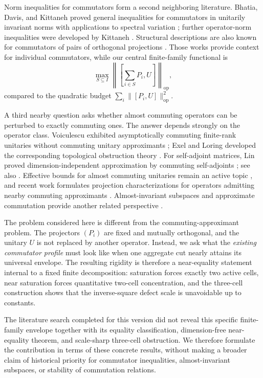 \documentclass[11pt]{article}
\newcommand{\op}{\mathrm{op}}
\begin{document}
Norm inequalities for commutators form a second neighboring literature.
Bhatia, Davis, and Kittaneh proved general inequalities for commutators in
unitarily invariant norms with applications to spectral variation
\cite{BhatiaDavisKittaneh1991}; further operator-norm inequalities were
developed by Kittaneh \cite{Kittaneh2007}.  Structural descriptions are also
known for commutators of pairs of orthogonal projections
\cite{Li2004}.  Those works provide context for individual commutators, while
our central finite-family functional is
\[
  \max_{S\subseteq I}
  \left\|
    \left[\sum_{i\in S}P_i,U\right]
  \right\|_{\op},
\]
compared to the quadratic budget
$\sum_i\|[P_i,U]\|_{\op}^2$.

A third nearby question asks whether almost commuting operators can be
perturbed to exactly commuting ones.  The answer depends strongly on the
operator class.  Voiculescu exhibited asymptotically commuting finite-rank
unitaries without commuting unitary approximants
\cite{Voiculescu1983}; Exel and Loring developed the corresponding
topological obstruction theory \cite{ExelLoring1989,ExelLoring1991}.  For
self-adjoint matrices, Lin proved dimension-independent approximation by
commuting self-adjoints \cite{Lin1997AlmostCommuting}; see also
\cite{FriisRordam1996,Hastings2009}.  Effective bounds for almost commuting
unitaries remain an active topic \cite{DorOnHallKachkovskiy2025}, and recent
work formulates projection characterizations for operators admitting nearby
commuting approximants \cite{Herrera2024,Herrera2026}.  Almost-invariant
subspaces and approximate commutation provide another related perspective
\cite{MarcouxPopovRadjavi2013}.

The problem considered here is different from the commuting-approximant
problem.  The projectors $(P_i)$ are fixed and mutually orthogonal, and the
unitary $U$ is not replaced by another operator.  Instead, we ask what the
\emph{existing commutator profile} must look like when one aggregate cut
nearly attains its universal envelope.  The resulting rigidity is therefore
a near-equality statement internal to a fixed finite decomposition:
saturation forces exactly two active cells, near saturation forces
quantitative two-cell concentration, and the three-cell construction shows
that the inverse-square defect scale is unavoidable up to constants.

The literature search completed for this version did not reveal this specific
finite-family envelope together with its equality classification,
dimension-free near-equality theorem, and scale-sharp three-cell obstruction.
We therefore formulate the contribution in terms of these concrete results,
without making a broader claim of historical priority for commutator
inequalities, almost-invariant subspaces, or stability of commutation
relations.
\end{document}
